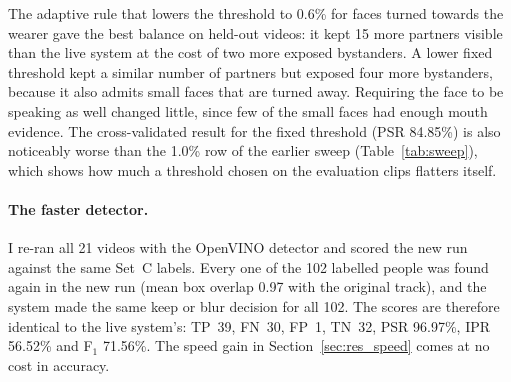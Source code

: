 \begin{table}[htbp]
\begin{singlespace}
\centering
\caption{Size-threshold changes on Set~C, estimated by leave-one-video-out
cross-validation. The setting most often chosen across the 21 folds is shown.}
\label{tab:adaptive}
\renewcommand{\arraystretch}{1.3}
\end{singlespace}
\end{table}

The adaptive rule that lowers the threshold to 0.6\% for faces turned towards the wearer
gave the best balance on held-out videos: it kept 15 more partners visible than the live
system at the cost of two more exposed bystanders. A lower fixed threshold kept a similar
number of partners but exposed four more bystanders, because it also admits small faces
that are turned away. Requiring the face to be speaking as well changed little, since
few of the small faces had enough mouth evidence. The cross-validated result for the
fixed threshold (PSR 84.85\%) is also noticeably worse than the 1.0\% row of the earlier
sweep (Table~\ref{tab:sweep}), which shows how much a threshold chosen on the evaluation
clips flatters itself.

\paragraph{The faster detector.}
I re-ran all 21 videos with the OpenVINO detector and scored the new run against the same
Set~C labels. Every one of the 102 labelled people was found again in the new run (mean
box overlap 0.97 with the original track), and the system made the same keep or blur
decision for all 102. The scores are therefore identical to the live system's: TP~39,
FN~30, FP~1, TN~32, PSR 96.97\%, IPR 56.52\% and F$_1$ 71.56\%. The speed gain in
Section~\ref{sec:res_speed} comes at no cost in accuracy.

